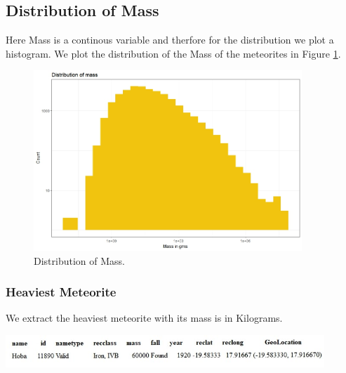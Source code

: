 \subsection{Distribution of Mass}
Here Mass is a continous variable and therfore for the distribution we plot a histogram. We plot the distribution of the Mass of the meteorites in Figure \ref{fig:fig6}.
\begin{figure}
	\centering
	\includegraphics[width=0.9\textwidth]{Figures/06DistributionOfMass.jpeg}
	\caption{\label{fig:fig6} Distribution of Mass.}
\end{figure}

\subsubsection{Heaviest Meteorite}
We extract the heaviest meteorite with its mass is in Kilograms.
\begin{center}
	\centering
	\includegraphics[width=0.9\textwidth]{Figures/07HeaviesMeteorite.jpeg}
\end{center}

